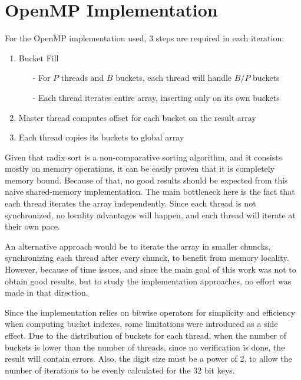 \section{OpenMP Implementation}
\label{sec:400}

For the OpenMP implementation used, 3 steps are required in each iteration:

\begin{enumerate}
	\item Bucket Fill
	\begin{itemize}
		\item[-] For $P$ threads and $B$ buckets, each thread will handle $B/P$ buckets
		\item[-] Each thread iterates entire array, inserting only on its own buckets
	\end{itemize}

	\item Master thread computes offset for each bucket on the result array

	\item Each thread copies its buckets to global array
\end{enumerate}

Given that radix sort is a non-comparative sorting algorithm, and it consists mostly on memory operations, it can be easily proven that it is completely memory bound. Because of that, no good results should be expected from this naive shared-memory implementation. The main bottleneck here is the fact that each thread iterates the array independently. Since each thread is not synchronized, no locality advantages will happen, and each thread will iterate at their own pace.

An alternative approach would be to iterate the array in smaller chuncks, synchronizing each thread after every chunck, to benefit from memory locality. However, because of time issues, and since the main goal of this work was not to obtain good results, but to study the implementation approaches, no effort was made in that direction.

Since the implementation relies on bitwise operators for simplicity and efficiency when computing bucket indexes, some limitations were introduced as a side effect. Due to the distribution of buckets for each thread, when the number of buckets is lower than the number of threads, since no verification is done, the result will contain errors. Also, the digit size must be a power of 2, to allow the number of iterations to be evenly calculated for the 32 bit keys.